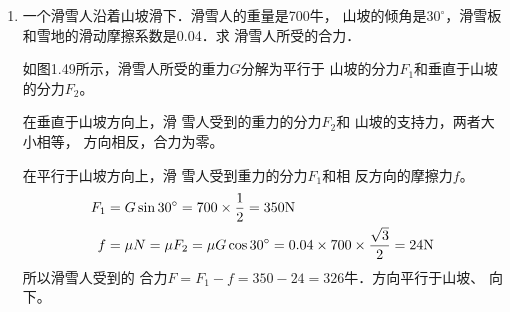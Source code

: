 \begin{enumerate}
\item 一个滑雪人沿着山坡滑下．滑雪人的重量是700牛，
山坡的倾角是$30^\circ$，滑雪板和雪地的滑动摩擦系数是0.04．求
滑雪人所受的合力．

\begin{solution}
如图1.49所示，滑雪人所受的重力$G$分解为平行于
山坡的分力$F_1$和垂直于山坡的分力$F_2$。

在垂直于山坡方向上，滑
雪人受到的重力的分力$F_2$和
山坡的支持力，两者大小相等，
方向相反，合力为零。

在平行于山坡方向上，滑
雪人受到重力的分力$F_1$和相
反方向的摩擦力$f$。
\[\begin{split}
   F_1&=G \sin 30^{\circ} =700\times\frac{1}{2}=350{\rm N}\\
   f&=\mu N=\mu F_2=\mu G\cos 30^{\circ}=0.04\times700\times\frac{\sqrt{3}}{2}=24{\rm N}
\end{split}\]
所以滑雪人受到的
合力$F=F_1-f=350-24=326$牛．方向平行于山坡、
向下。
\end{solution}
\end{enumerate}






















































































